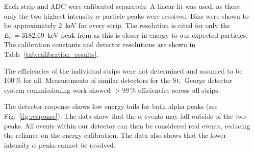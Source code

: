 Each strip and ADC were calibrated separately. A linear fit was used, as
there only the two highest intensity $\alpha$-particle peaks were
resolved. Bins were shown to be approximately 2~keV for every strip. The
resolution is cited for only the $E_{\alpha} = 3182.69$~keV peak from
 as this is closer in energy to our expected particles. The
calibration constants and detector resolutions are shown in
Table~\ref{tab:calibration_results}.

The efficiencies of the individual strips were not determined and
assumed to be 100\,\% for all. Measurements of similar detectors for the
St.\ George detector system commissioning work showed $>99$\,\%
efficiencies across all strips.

The detector response shows low energy tails for both alpha peaks (see
Fig.~\ref{fig:response}). The data show that the $\alpha$ events may
fall outside of the two peaks. All events within our detector can then
be considered real events, reducing the reliance on the energy
calibration. The data also shows that the lower intensity 
$\alpha$ peaks cannot be resolved.

